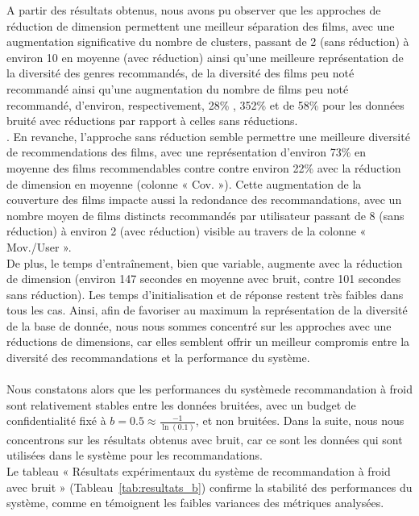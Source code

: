 \documentclass{article}
\begin{document}
A partir des résultats obtenus, nous avons pu observer que les approches de réduction de dimension permettent une meilleur séparation des films, avec une augmentation significative du nombre de clusters, passant de 2 (sans réduction) à environ 10 en moyenne (avec réduction) ainsi 
qu'une meilleure représentation de la diversité des genres recommandés, de la diversité des films peu noté recommandé ainsi qu'une augmentation du nombre de films peu noté recommandé, d'environ, respectivement, 28\% , 352\% et de 58\% pour les données bruité avec réductions par rapport à celles sans réductions.\\. 
En revanche, l'approche sans réduction semble permettre une meilleure diversité de recommendations des films, avec une représentation d'environ 73\% en moyenne des films recommendables contre contre environ 22\% avec la réduction de dimension en moyenne (colonne « Cov. »). Cette augmentation de la couverture des films 
impacte aussi la redondance des recommandations, avec un nombre moyen de films distincts recommandés par utilisateur passant de 8 (sans réduction) à environ 2 (avec réduction) visible au travers de la colonne « Mov./User ».\\
De plus, le temps d’entraînement, bien que variable, augmente avec la réduction de dimension (environ 147 secondes en moyenne avec bruit, contre 101 secondes sans réduction). Les temps d’initialisation et de réponse restent très faibles dans tous les cas.
Ainsi, afin de favoriser au maximum la représentation de la diversité de la base de donnée, nous nous sommes concentré sur les approches avec une réductions de dimensions, car elles semblent offrir un meilleur compromis entre la diversité des recommandations et la performance du système.\\
\\
Nous constatons alors que les performances du systèmede recommandation à froid sont relativement stables entre les données bruitées, avec un budget de confidentialité fixé à $b = 0.5 \approx \frac{-1}{\ln(0.1 )}$, et non bruitées. Dans
la suite, nous nous concentrons sur les résultats obtenus avec bruit, car ce sont les données qui sont utilisées dans le système pour les recommandations.\\
Le tableau « Résultats expérimentaux du système de recommandation à froid avec bruit » (Tableau~\ref{tab:resultats_b}) confirme la stabilité des performances
du système, comme en témoignent les faibles variances des métriques analysées.\\
\\
\end{document}
